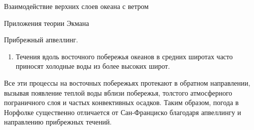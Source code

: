 \begin{chapter}{Взаимодействие верхних слоев океана с ветром}
\begin{section}{Приложения теории Экмана}
\begin{paragraph}{Прибрежный апвеллинг.}
\begin{enumerate}
\item
Течения вдоль восточного побережья океанов в средних широтах часто приносят
холодные воды из более высоких широт.
%
\end{enumerate}
Все эти процессы на восточных побережьях протекают в обратном направлении,
вызывая появление теплой воды вблизи побережья, толстого атмосферного 
пограничного слоя и частых конвективных осадков. Таким образом, погода 
в Норфолке существенно отличается от Сан-Франциско благодаря 
апвеллингу и направлению прибрежных течений.
%
\end{paragraph}


\end{section}
\end{chapter}
